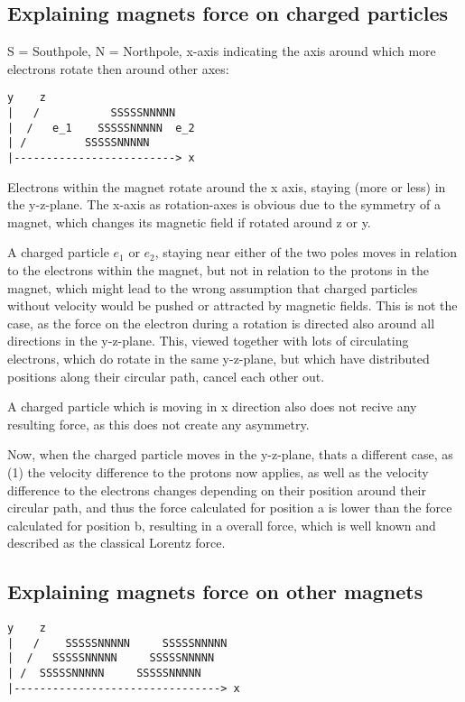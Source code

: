 \documentclass[12pt,a4paper,twocolumn]{article}
\begin{document}
\subsection{Explaining magnets force on charged particles}
S = Southpole, N = Northpole, x-axis indicating the axis around which more electrons rotate then around other axes:

\begin{verbatim}
y    z
|   /           SSSSSNNNNN
|  /   e_1    SSSSSNNNNN  e_2
| /         SSSSSNNNNN
|-------------------------> x
\end{verbatim}

Electrons within the magnet rotate around the x axis, staying (more or less) in the y-z-plane. The x-axis as rotation-axes is obvious due to the symmetry of a magnet, which changes its magnetic field if rotated around z or y.

A charged particle $e_1$ or $e_2$, staying near either of the two poles moves in relation to the electrons within the magnet, but not in relation to the protons in the magnet, which might lead to the wrong assumption that charged particles without velocity would be pushed or attracted by magnetic fields. This is not the case, as the force on the electron during a rotation is directed also around all directions in the y-z-plane. This, viewed together with lots of circulating electrons, which do rotate in the same y-z-plane, but which have distributed positions along their circular path, cancel each other out.

A charged particle which is moving in x direction also does not recive any resulting force, as this does not create any asymmetry.

Now, when the charged particle moves in the y-z-plane, thats a different case, as (1) the velocity difference to the protons now applies, as well as the velocity difference to the electrons changes depending on their position around their circular path, and thus the force calculated for position a is lower than the force calculated for position b, resulting in a overall force, which is well known and described as the classical Lorentz force.

\subsection{Explaining magnets force on other magnets}
\begin{verbatim}
y    z
|   /    SSSSSNNNNN     SSSSSNNNNN
|  /   SSSSSNNNNN     SSSSSNNNNN
| /  SSSSSNNNNN     SSSSSNNNNN
|--------------------------------> x
\end{verbatim}
\end{document}
